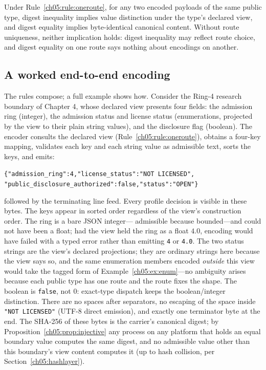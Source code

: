\begin{proposition}
\label{ch05:prop:comparability}
Under Rule~\ref{ch05:rule:oneroute}, for any two encoded payloads of the
same public type, digest inequality implies value distinction under the
type's declared view, and digest equality implies byte-identical canonical
content. Without route uniqueness, neither implication holds: digest
inequality may reflect route choice, and digest equality on one route says
nothing about encodings on another.
\end{proposition}

\subsection{A worked end-to-end encoding}\label{ch05:worked}

The rules compose; a full example shows how. Consider the Ring-4
research boundary of Chapter 4, whose declared view presents four
fields: the admission ring (integer), the admission status and license
status (enumerations, projected by the view to their plain string
values), and the disclosure flag (boolean). The encoder consults the
declared view (Rule~\ref{ch05:rule:oneroute}), obtains a four-key
mapping, validates each key and each string value as admissible text,
sorts the keys, and emits:
\begin{center}
\texttt{\{"admission\_ring":4,"license\_status":"NOT LICENSED",}\\
\texttt{"public\_disclosure\_authorized":false,"status":"OPEN"\}}
\end{center}
followed by the terminating line feed. Every profile decision is
visible in these bytes. The keys appear in sorted order regardless of
the view's construction order. The ring is a bare JSON integer---
admissible because bounded---and could not have been a float; had the
view held the ring as a float $4.0$, encoding would have failed with a
typed error rather than emitting \texttt{4} or \texttt{4.0}. The two
status strings are the view's declared projections; they are ordinary
strings here because the view says so, and the same enumeration members
encoded \emph{outside} this view would take the tagged form of
Example~\ref{ch05:ex:enum}---no ambiguity arises because each public
type has one route and the route fixes the shape. The boolean is
\texttt{false}, not $0$: exact-type dispatch keeps the boolean/integer
distinction. There are no spaces after separators, no escaping of the
space inside \texttt{"NOT LICENSED"} (UTF-8 direct emission), and
exactly one terminator byte at the end. The SHA-256 of these bytes is
the carrier's canonical digest; by
Proposition~\ref{ch05:prop:injective} any process on any platform that
holds an equal boundary value computes the same digest, and no
admissible value other than this boundary's view content computes it
(up to hash collision, per Section~\ref{ch05:hashlayer}).


